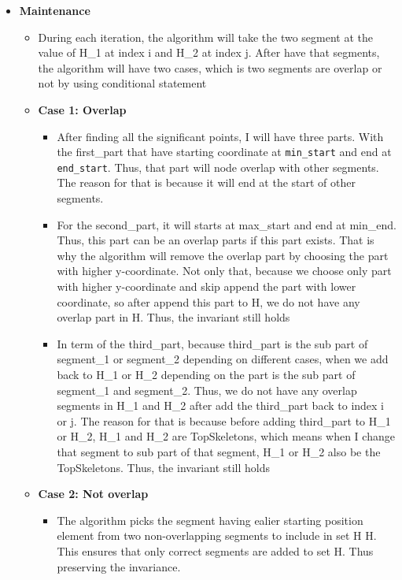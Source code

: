 \documentclass{article}
\begin{document}
\begin{enumerate}[label=({\alph*})]
\begin{itemize}
\begin{itemize}
				\item \textbf{Maintenance}
				\begin{itemize}
					\item During each iteration, the algorithm will take the two segment at the value of H\_1 at index i and H\_2 at index j. After have that segments, the algorithm will have two cases, which is two segments are overlap or not by using conditional statement 
					\item \textbf{Case 1: Overlap}
					\begin{itemize}
						\item After finding all the significant points, I will have three parts. With the first\_part that have starting coordinate at \verb|min_start| and end at \verb|end_start|. Thus, that part will node overlap with other segments. The reason for that is because it will end at the start of other segments.
						\item For the second\_part, it will starts at max\_start and end at min\_end. Thus, this part can be an overlap parts if this part exists. That is why the algorithm will remove the overlap part by choosing the part with higher y-coordinate. Not only that, because we choose only part with higher y-coordinate and skip append the part with lower coordinate, so after append this part to H, we do not have any overlap part in H. Thus, the invariant still holds 
						\item In term of the third\_part, because third\_part is the sub part of segment\_1 or segment\_2 depending on different cases, when we add back to H\_1 or H\_2 depending on the part is the sub part of segment\_1 and segment\_2. Thus, we do not have any overlap segments in H\_1 and H\_2 after add the third\_part back to index i or j. The reason for that is because before adding third\_part to H\_1 or H\_2, H\_1 and H\_2 are TopSkeletons, which means when I change that segment to sub part of that segment, H\_1 or H\_2 also be the TopSkeletons. Thus, the invariant still holds 
					\end{itemize}
					\item \textbf{Case 2: Not overlap}
					\begin{itemize}
						\item The algorithm picks the segment having ealier starting position element from two non-overlapping segments to include in set H
						H. This ensures that only correct segments are added to set H. Thus preserving the invariance.
					\end{itemize}

\end{itemize}
\end{itemize}
\end{itemize}
\end{enumerate}
\end{document}
